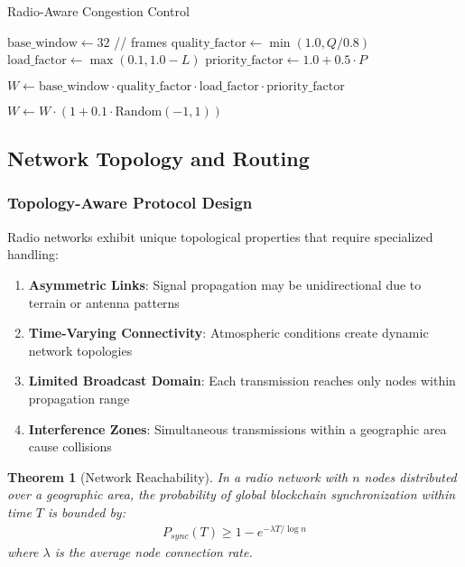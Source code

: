 \documentclass[11pt,a4paper]{article}
\newtheorem{theorem}{Theorem}[section]
\begin{document}
\begin{algorithm}[H]
\SetAlgoLined
{}
\caption{Radio-Aware Congestion Control}

$\text{base\_window} \leftarrow 32$\; // frames
$\text{quality\_factor} \leftarrow \min(1.0, Q / 0.8)$\;
$\text{load\_factor} \leftarrow \max(0.1, 1.0 - L)$\;
$\text{priority\_factor} \leftarrow 1.0 + 0.5 \cdot P$\;

$W \leftarrow \text{base\_window} \cdot \text{quality\_factor} \cdot \text{load\_factor} \cdot \text{priority\_factor}$\;

$W \leftarrow W \cdot (1 + 0.1 \cdot \text{Random}(-1, 1))$\;

\;
\end{algorithm}

\subsection{Network Topology and Routing}

\subsubsection{Topology-Aware Protocol Design}

Radio networks exhibit unique topological properties that require specialized handling:

\begin{enumerate}
\item \textbf{Asymmetric Links}: Signal propagation may be unidirectional due to terrain or antenna patterns
\item \textbf{Time-Varying Connectivity}: Atmospheric conditions create dynamic network topologies
\item \textbf{Limited Broadcast Domain}: Each transmission reaches only nodes within propagation range
\item \textbf{Interference Zones}: Simultaneous transmissions within a geographic area cause collisions
\end{enumerate}

\begin{theorem}[Network Reachability]
In a radio network with $n$ nodes distributed over a geographic area, the probability of global blockchain synchronization within time $T$ is bounded by:
\begin{align}
P_{sync}(T) \geq 1 - e^{-\lambda T / \log n}
\end{align}
where $\lambda$ is the average node connection rate.
\end{theorem}
\end{document}

